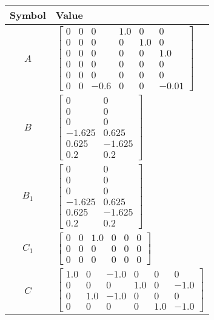 \begin{tabular}{cl}
\hline
  Symbol  & Value                                                                                                                                                                                          \\
\hline
   $A$    & $\left[\begin{matrix}0 & 0 & 0 & 1.0 & 0 & 0\\0 & 0 & 0 & 0 & 1.0 & 0\\0 & 0 & 0 & 0 & 0 & 1.0\\0 & 0 & 0 & 0 & 0 & 0\\0 & 0 & 0 & 0 & 0 & 0\\0 & 0 & -0.6 & 0 & 0 & -0.01\end{matrix}\right]$ \\
   $B$    & $\left[\begin{matrix}0 & 0\\0 & 0\\0 & 0\\-1.625 & 0.625\\0.625 & -1.625\\0.2 & 0.2\end{matrix}\right]$                                                                                        \\
 $B_{1}$  & $\left[\begin{matrix}0 & 0\\0 & 0\\0 & 0\\-1.625 & 0.625\\0.625 & -1.625\\0.2 & 0.2\end{matrix}\right]$                                                                                        \\
 $C_{1}$  & $\left[\begin{matrix}0 & 0 & 1.0 & 0 & 0 & 0\\0 & 0 & 0 & 0 & 0 & 0\\0 & 0 & 0 & 0 & 0 & 0\end{matrix}\right]$                                                                                 \\
   $C$    & $\left[\begin{matrix}1.0 & 0 & -1.0 & 0 & 0 & 0\\0 & 0 & 0 & 1.0 & 0 & -1.0\\0 & 1.0 & -1.0 & 0 & 0 & 0\\0 & 0 & 0 & 0 & 1.0 & -1.0\end{matrix}\right]$                                        \\

\end{tabular}
